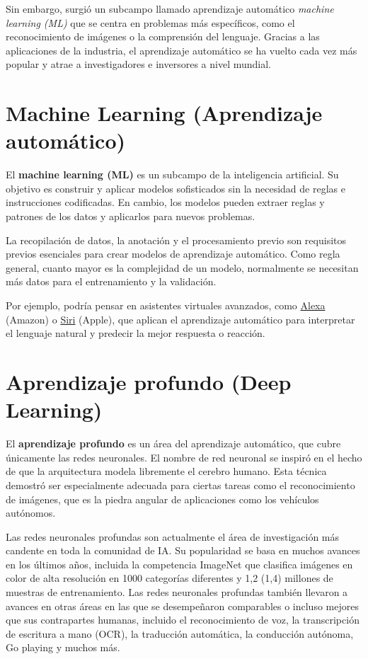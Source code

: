 \documentclass[
]{book}
\begin{document}
Sin embargo, surgió un subcampo llamado aprendizaje automático \emph{machine learning (ML)} que se centra en problemas más específicos, como el reconocimiento de imágenes o la comprensión del lenguaje. Gracias a las aplicaciones de la industria, el aprendizaje automático se ha vuelto cada vez más popular y atrae a investigadores e inversores a nivel mundial.

\hypertarget{machine-learning-aprendizaje-automuxe1tico}{%
\section{Machine Learning (Aprendizaje automático)}\label{machine-learning-aprendizaje-automuxe1tico}}

El \textbf{machine learning (ML)} es un subcampo de la inteligencia artificial. Su objetivo es construir y aplicar modelos sofisticados sin la necesidad de reglas e instrucciones codificadas. En cambio, los modelos pueden extraer reglas y patrones de los datos y aplicarlos para nuevos problemas.

La recopilación de datos, la anotación y el procesamiento previo son requisitos previos esenciales para crear modelos de aprendizaje automático. Como regla general, cuanto mayor es la complejidad de un modelo, normalmente se necesitan más datos para el entrenamiento y la validación.

Por ejemplo, podría pensar en asistentes virtuales avanzados, como \href{https://developer.amazon.com/alexa}{Alexa} (Amazon) o \href{https://www.apple.com/siri}{Siri} (Apple), que aplican el aprendizaje automático para interpretar el lenguaje natural y predecir la mejor respuesta o reacción.

\hypertarget{aprendizaje-profundo-deep-learning}{%
\section{Aprendizaje profundo (Deep Learning)}\label{aprendizaje-profundo-deep-learning}}

El \textbf{aprendizaje profundo} es un área del aprendizaje automático, que cubre únicamente las redes neuronales. El nombre de red neuronal se inspiró en el hecho de que la arquitectura modela libremente el cerebro humano. Esta técnica demostró ser especialmente adecuada para ciertas tareas como el reconocimiento de imágenes, que es la piedra angular de aplicaciones como los vehículos autónomos.

Las redes neuronales profundas son actualmente el área de investigación más candente en toda la comunidad de IA. Su popularidad se basa en muchos avances en los últimos años, incluida la competencia ImageNet que clasifica imágenes en color de alta resolución en 1000 categorías diferentes y 1,2 (1,4) millones de muestras de entrenamiento. Las redes neuronales profundas también llevaron a avances en otras áreas en las que se desempeñaron comparables o incluso mejores que sus contrapartes humanas, incluido el reconocimiento de voz, la transcripción de escritura a mano (OCR), la traducción automática, la conducción autónoma, Go playing y muchos más.
\end{document}
